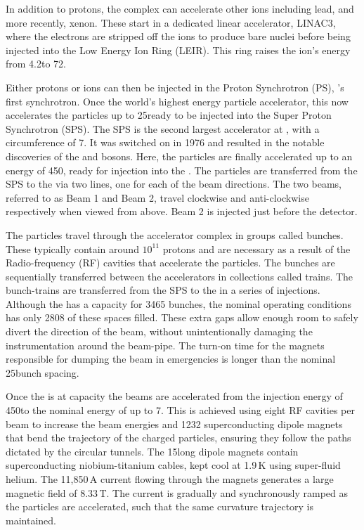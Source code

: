 In addition to protons, the complex can accelerate other ions including lead, and more recently, xenon. These start in a dedicated linear accelerator, LINAC3, where the electrons are stripped off the ions to produce bare nuclei before being injected into the Low Energy Ion Ring (LEIR). This ring raises the ion's energy from 4.2\mev to 72\mev. 

Either protons or ions can then be injected in the Proton Synchrotron (PS), \cern's first synchrotron. Once the world's highest energy particle accelerator, this now accelerates the particles up to 25\gev ready to be injected into the Super Proton Synchrotron (SPS).
The SPS is the second largest accelerator at \cern, with a circumference of 7\km. It was switched on in 1976 and resulted in the notable discoveries of the \W and \Z bosons. Here, the particles are finally accelerated up to an energy of 450\gev, ready for injection into the \lhc. The particles are transferred from the SPS to the \lhc via two lines, one for each of the \lhc beam directions. The two beams, referred to as Beam 1 and Beam 2, travel clockwise and anti-clockwise respectively when viewed from above. Beam 2 is injected just before the \lhcb detector. 

The particles travel through the accelerator complex in groups called bunches. These typically contain around $10^{11}$ protons and are necessary as a result of the Radio-frequency (RF) cavities that accelerate the particles. The bunches are sequentially transferred between the accelerators in collections called trains. The bunch-trains are transferred from the SPS to the \lhc in a series of injections. Although the \lhc has a capacity for 3465 bunches, the nominal operating conditions has only 2808 of these spaces filled. 
These extra gaps allow enough room to safely divert the direction of the beam, without unintentionally damaging the instrumentation around the beam-pipe. The turn-on time for the magnets responsible for dumping the beam in emergencies is longer than the nominal 25\ns bunch spacing. 


Once the \lhc is at capacity the beams are accelerated from the injection energy of 450\gev to the nominal energy of up to 7\tev. This is achieved using eight RF cavities per beam to increase the beam energies and 1232 superconducting dipole magnets that bend the trajectory of the charged particles, ensuring they follow the paths dictated by the circular tunnels. The 15\m long dipole magnets contain superconducting niobium-titanium cables, kept cool at 1.9\,K using super-fluid helium. The 11,850\,A current flowing through the magnets generates a large magnetic field of 8.33\,T. The current is gradually and synchronously ramped as the particles are accelerated, such that the same curvature trajectory is maintained. 

